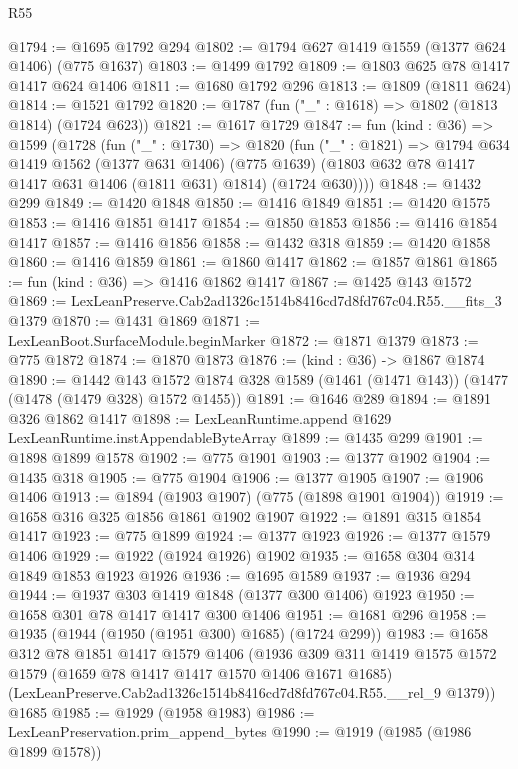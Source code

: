 \begin{lexlean}{R55}
\begin{coremodule}
{{@1794 := @1695 @1792 @294
@1802 := @1794 @627 @1419 @1559 (@1377 @624 @1406) (@775 @1637)
@1803 := @1499 @1792
@1809 := @1803 @625 @78 @1417 @1417 @624 @1406
@1811 := @1680 @1792 @296
@1813 := @1809 (@1811 @624)
@1814 := @1521 @1792
@1820 := @1787 (fun ("_" : @1618) => @1802 (@1813 @1814) (@1724 @623))
@1821 := @1617 @1729
@1847 := fun (kind : @36) =>
  @1599
    (@1728
      (fun ("_" : @1730) =>
      @1820
        (fun ("_" : @1821) =>
        @1794
          @634
          @1419
          @1562
          (@1377 @631 @1406)
          (@775 @1639)
          (@1803 @632 @78 @1417 @1417 @631 @1406 (@1811 @631) @1814)
          (@1724 @630))))
@1848 := @1432 @299
@1849 := @1420 @1848
@1850 := @1416 @1849
@1851 := @1420 @1575
@1853 := @1416 @1851 @1417
@1854 := @1850 @1853
@1856 := @1416 @1854 @1417
@1857 := @1416 @1856
@1858 := @1432 @318
@1859 := @1420 @1858
@1860 := @1416 @1859
@1861 := @1860 @1417
@1862 := @1857 @1861
@1865 := fun (kind : @36) => @1416 @1862 @1417
@1867 := @1425 @143 @1572
@1869 := LexLeanPreserve.Cab2ad1326c1514b8416cd7d8fd767c04.R55.__fits_3 @1379
@1870 := @1431 @1869
@1871 := LexLeanBoot.SurfaceModule.beginMarker
@1872 := @1871 @1379
@1873 := @775 @1872
@1874 := @1870 @1873
@1876 := (kind : @36) -> @1867 @1874
@1890 := @1442
    @143
    @1572
    @1874
    @328
    @1589
    (@1461 (@1471 @143))
    (@1477 (@1478 (@1479 @328) @1572 @1455))
@1891 := @1646 @289
@1894 := @1891 @326 @1862 @1417
@1898 := LexLeanRuntime.append @1629 LexLeanRuntime.instAppendableByteArray
@1899 := @1435 @299
@1901 := @1898 @1899 @1578
@1902 := @775 @1901
@1903 := @1377 @1902
@1904 := @1435 @318
@1905 := @775 @1904
@1906 := @1377 @1905
@1907 := @1906 @1406
@1913 := @1894 (@1903 @1907) (@775 (@1898 @1901 @1904))
@1919 := @1658 @316 @325 @1856 @1861 @1902 @1907
@1922 := @1891 @315 @1854 @1417
@1923 := @775 @1899
@1924 := @1377 @1923
@1926 := @1377 @1579 @1406
@1929 := @1922 (@1924 @1926) @1902
@1935 := @1658 @304 @314 @1849 @1853 @1923 @1926
@1936 := @1695 @1589
@1937 := @1936 @294
@1944 := @1937 @303 @1419 @1848 (@1377 @300 @1406) @1923
@1950 := @1658 @301 @78 @1417 @1417 @300 @1406
@1951 := @1681 @296
@1958 := @1935 (@1944 (@1950 (@1951 @300) @1685) (@1724 @299))
@1983 := @1658
    @312
    @78
    @1851
    @1417
    @1579
    @1406
    (@1936
      @309
      @311
      @1419
      @1575
      @1572
      @1579
      (@1659 @78 @1417 @1417 @1570 @1406 @1671 @1685)
      (LexLeanPreserve.Cab2ad1326c1514b8416cd7d8fd767c04.R55.__rel_9 @1379))
    @1685
@1985 := @1929 (@1958 @1983)
@1986 := LexLeanPreservation.prim_append_bytes
@1990 := @1919 (@1985 (@1986 @1899 @1578))
}}
\end{coremodule}
\end{lexlean}
